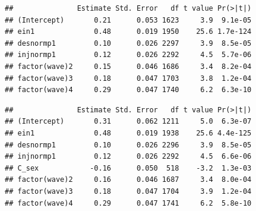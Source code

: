 \documentclass[
]{book}
\newenvironment{Shaded}{\begin{snugshade}}{\end{snugshade}}
\newcommand{\CommentTok}[1]{\textcolor[rgb]{0.56,0.35,0.01}{\textit{#1}}}
\newcommand{\DataTypeTok}[1]{\textcolor[rgb]{0.13,0.29,0.53}{#1}}
\newcommand{\DecValTok}[1]{\textcolor[rgb]{0.00,0.00,0.81}{#1}}
\newcommand{\KeywordTok}[1]{\textcolor[rgb]{0.13,0.29,0.53}{\textbf{#1}}}
\newcommand{\NormalTok}[1]{#1}
\newcommand{\OperatorTok}[1]{\textcolor[rgb]{0.81,0.36,0.00}{\textbf{#1}}}
\newcommand{\StringTok}[1]{\textcolor[rgb]{0.31,0.60,0.02}{#1}}
\begin{document}
\begin{Shaded}
\end{Shaded}

\begin{verbatim}
##               Estimate Std. Error   df t value Pr(>|t|)
## (Intercept)       0.21      0.053 1623     3.9  9.1e-05
## ein1              0.48      0.019 1950    25.6 1.7e-124
## desnormp1         0.10      0.026 2297     3.9  8.5e-05
## injnormp1         0.12      0.026 2292     4.5  5.7e-06
## factor(wave)2     0.15      0.046 1686     3.4  8.2e-04
## factor(wave)3     0.18      0.047 1703     3.8  1.2e-04
## factor(wave)4     0.29      0.047 1740     6.2  6.3e-10
\end{verbatim}

\begin{Shaded}
\end{Shaded}

\begin{verbatim}
##               Estimate Std. Error   df t value Pr(>|t|)
## (Intercept)       0.31      0.062 1211     5.0  6.3e-07
## ein1              0.48      0.019 1938    25.6 4.4e-125
## desnormp1         0.10      0.026 2296     3.9  8.5e-05
## injnormp1         0.12      0.026 2292     4.5  6.6e-06
## C_sex            -0.16      0.050  518    -3.2  1.3e-03
## factor(wave)2     0.16      0.046 1687     3.4  8.0e-04
## factor(wave)3     0.18      0.047 1704     3.9  1.2e-04
## factor(wave)4     0.29      0.047 1741     6.2  5.8e-10
\end{verbatim}
\end{document}
